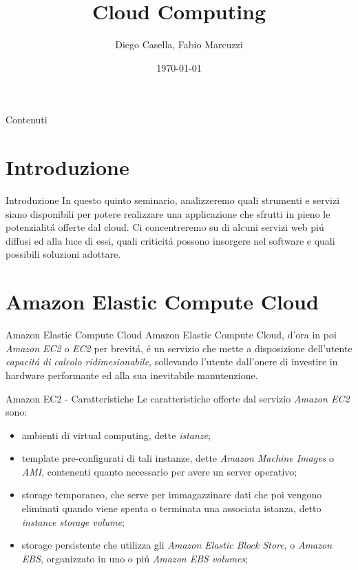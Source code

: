 \documentclass{beamer}
\title{Cloud Computing}
\author{Diego Casella, Fabio Marcuzzi}
\date{\today}
\begin{document}
\maketitle

\begin{frame}{Contenuti} %
\tableofcontents
\end{frame}

\section{Introduzione}
\begin{frame}{Introduzione}
In questo quinto  seminario, analizzeremo quali strumenti e servizi siano disponibili per potere realizzare una
applicazione che sfrutti in pieno le potenzialit\'a offerte dal cloud. Ci concentreremo su di alcuni servizi web pi\'u diffusi ed
alla luce di essi, quali criticit\'a possono insorgere nel software e quali possibili soluzioni adottare.
\end{frame}


%
\section{Amazon Elastic Compute Cloud}
\begin{frame}{Amazon Elastic Compute Cloud}
Amazon Elastic Compute Cloud, d'ora in poi \emph{Amazon EC2} o \emph{EC2} per brevit\'a, \'e un servizio che mette a disposizione dell'utente \emph{capacit\'a di calcolo ridimesionabile}, 
sollevando l'utente dall'onere di investire in hardware performante ed alla sua inevitabile manutenzione.
\end{frame}


\begin{frame}{Amazon EC2 - Caratteristiche}
Le caratteristiche offerte dal servizio \emph{Amazon EC2} sono:
\begin{itemize}
\item ambienti di virtual computing, dette \emph{istanze};
\item template pre-configurati di tali instanze, dette \emph{Amazon Machine Images} o \emph{AMI}, contenenti quanto necessario per avere un server operativo;
\item storage temporaneo, che serve per immagazzinare dati che poi vengono eliminati quando viene spenta o terminata una associata istanza, detto \emph{instance storage volume};
\item storage persistente che utilizza gli \emph{Amazon Elastic Block Store}, o \emph{Amazon EBS}, organizzato in uno o pi\'u \emph{Amazon EBS  volumes};
\end{itemize}
\end{frame}
\end{document}
